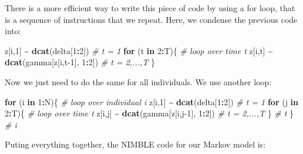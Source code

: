 \documentclass[
  12pt,
]{krantz}
\newenvironment{Shaded}{\begin{snugshade}}{\end{snugshade}}
\newcommand{\CommentTok}[1]{\textcolor[rgb]{0.56,0.35,0.01}{\textit{#1}}}
\newcommand{\ControlFlowTok}[1]{\textcolor[rgb]{0.13,0.29,0.53}{\textbf{#1}}}
\newcommand{\DecValTok}[1]{\textcolor[rgb]{0.00,0.00,0.81}{#1}}
\newcommand{\FunctionTok}[1]{\textcolor[rgb]{0.13,0.29,0.53}{\textbf{#1}}}
\newcommand{\NormalTok}[1]{#1}
\newcommand{\SpecialCharTok}[1]{\textcolor[rgb]{0.81,0.36,0.00}{\textbf{#1}}}
\begin{document}
There is a more efficient way to write this piece of code by using a for loop, that is a sequence of instructions that we repeat. Here, we condense the previous code into:

\begin{Shaded}
\begin{Highlighting}[]
\NormalTok{z[i,}\DecValTok{1}\NormalTok{] }\SpecialCharTok{\textasciitilde{}} \FunctionTok{dcat}\NormalTok{(delta[}\DecValTok{1}\SpecialCharTok{:}\DecValTok{2}\NormalTok{])             }\CommentTok{\# t = 1}
\ControlFlowTok{for}\NormalTok{ (t }\ControlFlowTok{in} \DecValTok{2}\SpecialCharTok{:}\NormalTok{T)\{ }\CommentTok{\# loop over time t}
\NormalTok{  z[i,t] }\SpecialCharTok{\textasciitilde{}} \FunctionTok{dcat}\NormalTok{(gamma[z[i,t}\DecValTok{{-}1}\NormalTok{], }\DecValTok{1}\SpecialCharTok{:}\DecValTok{2}\NormalTok{]) }\CommentTok{\# t = 2,...,T}
\NormalTok{\}}
\end{Highlighting}
\end{Shaded}

Now we just need to do the same for all individuals. We use another loop:

\begin{Shaded}
\begin{Highlighting}[]
\ControlFlowTok{for}\NormalTok{ (i }\ControlFlowTok{in} \DecValTok{1}\SpecialCharTok{:}\NormalTok{N)\{ }\CommentTok{\# loop over individual i}
\NormalTok{  z[i,}\DecValTok{1}\NormalTok{] }\SpecialCharTok{\textasciitilde{}} \FunctionTok{dcat}\NormalTok{(delta[}\DecValTok{1}\SpecialCharTok{:}\DecValTok{2}\NormalTok{]) }\CommentTok{\# t = 1}
  \ControlFlowTok{for}\NormalTok{ (j }\ControlFlowTok{in} \DecValTok{2}\SpecialCharTok{:}\NormalTok{T)\{ }\CommentTok{\# loop over time t}
\NormalTok{    z[i,j] }\SpecialCharTok{\textasciitilde{}} \FunctionTok{dcat}\NormalTok{(gamma[z[i,j}\DecValTok{{-}1}\NormalTok{], }\DecValTok{1}\SpecialCharTok{:}\DecValTok{2}\NormalTok{]) }\CommentTok{\# t = 2,...,T}
\NormalTok{  \} }\CommentTok{\# t}
\NormalTok{\} }\CommentTok{\# i}
\end{Highlighting}
\end{Shaded}

Puting everything together, the NIMBLE code for our Markov model is:
\end{document}
